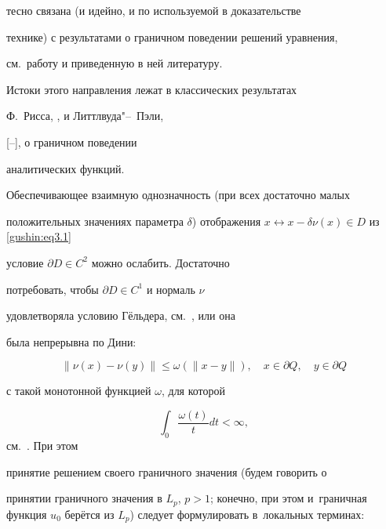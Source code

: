 тесно связана (и идейно, и по используемой в доказательстве

технике) с результатами о  граничном поведении решений уравнения,

см.~работу \cite{gushin:GM91} и приведенную в ней литературу.

Истоки этого направления лежат в классических результатах

Ф.~Рисса, \cite{gushin:Riesz}, и Литтлвуда"--~Пэли,

[--], о граничном поведении

аналитических функций.



Обеспечивающее взаимную однозначность (при всех достаточно малых

положительных значениях параметра $\delta$) отображения $x

\leftrightarrow x - \delta \nu(x) \in D$ из \eqref{gushin:eq3.1}

условие $\partial D \in C^2$ можно ослабить. Достаточно

потребовать, чтобы $\partial D \in C^1$ и нормаль $\nu$

удовлетворяла условию Гёльдера, см.~\cite{gushin:Petr83}, или она

была непрерывна по Дини:

\begin{equation}

\label{gushin:eq3.3} \| \nu(x) - \nu(y)\| \le \omega (\| x

-y\|),\quad x\in\partial Q,\quad  y\in\partial Q

\end{equation}

с такой монотонной функцией $\omega$, для которой 

$$\int _0

\frac{\omega (t)}{t} dt < \infty,$$ см.~\cite{gushin:G88}. При этом

принятие решением своего граничного значения (будем говорить о

принятии граничного значения в $L_p$, $p>1$; конечно, при этом и~граничная функция $u_0$ берётся из $L_p$) следует формулировать в~локальных терминах:



